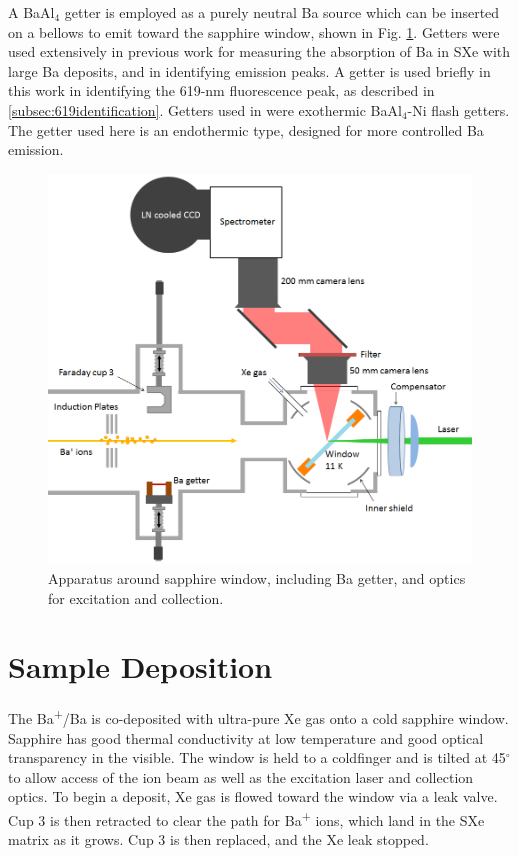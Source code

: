 A BaAl$_{4}$ getter is employed as a purely neutral Ba source which can be inserted on a bellows to emit toward the sapphire window, shown in Fig. \ref{fig:endOfBeam}.  Getters were used extensively in previous work \cite{Brian} for measuring the absorption of Ba in SXe with large Ba deposits, and in identifying emission peaks.  A getter is used briefly in this work in identifying the 619-nm fluorescence peak, as described in \ref{subsec:619identification}.  Getters used in \cite{Brian} were exothermic BaAl$_{4}$-Ni flash getters.  The getter used here is an endothermic type, designed for more controlled Ba emission.  

\begin{figure} %
        \centering
                \includegraphics[width=.9\textwidth]{figures/window_etc.png}
                \caption{Apparatus around sapphire window, including Ba getter, and optics for excitation and collection.}
\label{fig:endOfBeam}
\end{figure}

\section{Sample Deposition}
\label{sec:deposition}

The Ba\textsuperscript{+}/Ba is co-deposited with ultra-pure Xe gas onto a cold sapphire window.  Sapphire has good thermal conductivity at low temperature and good optical transparency in the visible.  The window is held to a coldfinger and is tilted at 45$^{\circ}$ to allow access of the ion beam as well as the excitation laser and collection optics.  To begin a deposit, Xe gas is flowed toward the window via a leak valve.  Cup 3 is then retracted to clear the path for Ba\textsuperscript{+} ions, which land in the SXe matrix as it grows.  Cup 3 is then replaced, and the Xe leak stopped.

